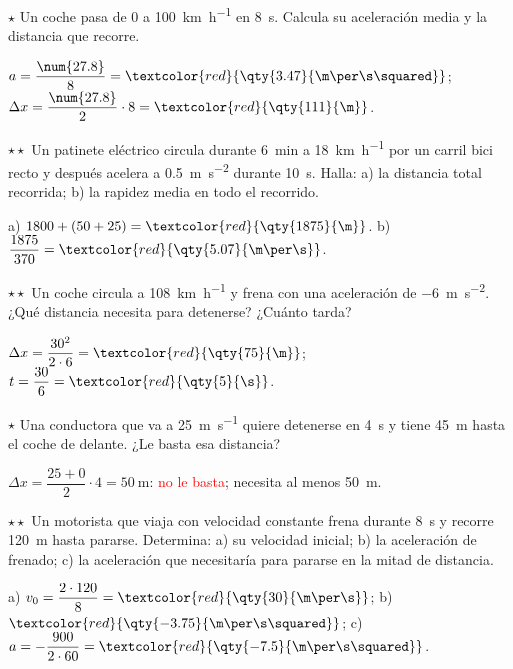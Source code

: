 \begin{exercise}
    \(\star\) Un coche pasa de 0 a \qty{100}{\km\per\hour} en \qty{8}{\s}. Calcula su aceleración media y la distancia que recorre.
    \begin{solu}
        \(a = \dfrac{\num{27.8}}{8} = \textcolor{red}{\qty{3.47}{\m\per\s\squared}}\); \(\Delta x = \dfrac{\num{27.8}}{2} \cdot 8 =
        \textcolor{red}{\qty{111}{\m}}\).
    \end{solu}
\end{exercise}

\begin{exercise}
    \(\star\star\) Un patinete eléctrico circula durante \qty{6}{\minute} a \qty{18}{\km\per\hour} por un carril bici recto y
    después acelera a \qty{0.5}{\m\per\s\squared} durante \qty{10}{\s}. Halla: a) la distancia total recorrida; b) la rapidez media
    en todo el recorrido.
    \begin{solu}
        a) \(1800 + (50 + 25) = \textcolor{red}{\qty{1875}{\m}}\). b) \(\dfrac{1875}{370} = \textcolor{red}{\qty{5.07}{\m\per\s}}\).
    \end{solu}
\end{exercise}

\begin{exercise}
    \(\star\star\) Un coche circula a \qty{108}{\km\per\hour} y frena con una aceleración de \qty{-6}{\m\per\s\squared}. ¿Qué
    distancia necesita para detenerse? ¿Cuánto tarda?
    \begin{solu}
        \(\Delta x = \dfrac{30^2}{2 \cdot 6} = \textcolor{red}{\qty{75}{\m}}\); \(t = \dfrac{30}{6} = \textcolor{red}{\qty{5}{\s}}\).
    \end{solu}
\end{exercise}

\begin{exercise}
    \(\star\) Una conductora que va a \qty{25}{\m\per\s} quiere detenerse en \qty{4}{\s} y tiene \qty{45}{\m} hasta el coche de
    delante. ¿Le basta esa distancia?
    \begin{solu}
        \(\Delta x = \dfrac{25 + 0}{2} \cdot 4 = \qty{50}{\m}\): \textcolor{red}{no le basta}; necesita al menos \qty{50}{\m}.
    \end{solu}
\end{exercise}

\begin{exercise}
    \(\star\star\) Un motorista que viaja con velocidad constante frena durante \qty{8}{\s} y recorre \qty{120}{\m} hasta pararse.
    Determina: a) su velocidad inicial; b) la aceleración de frenado; c) la aceleración que necesitaría para pararse en la mitad de
    distancia.
    \begin{solu}
        a) \(v_0 = \dfrac{2 \cdot 120}{8} = \textcolor{red}{\qty{30}{\m\per\s}}\); b) \(\textcolor{red}{\qty{-3.75}{\m\per\s\squared}}\);
        c) \(a = -\dfrac{900}{2 \cdot 60} = \textcolor{red}{\qty{-7.5}{\m\per\s\squared}}\).
    \end{solu}
\end{exercise}

